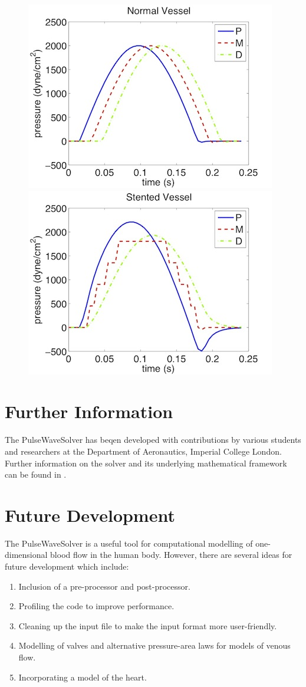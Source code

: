 \begin{figure}
	\includegraphics[width=0.49\linewidth]{img/pressure_normal_vessel.jpg}
	\includegraphics[width=0.49\linewidth]{img/pressure_stented_vessel.jpg}
\end{figure}

\section{Further Information}
The PulseWaveSolver has beqen developed with contributions by various students
and researchers at the Department of Aeronautics, Imperial College London. 
Further information on the solver and its underlying mathematical framework 
can be found in \cite{Ro12,Pi12}.

\section{Future Development}
The PulseWaveSolver is a useful tool for computational modelling of
one-dimensional blood flow in the human body. However, there are several ideas
for future development which include:
\begin{enumerate}
\item Inclusion of a pre-processor and post-processor.
\item Profiling the code to improve performance.
\item Cleaning up the input file to make the input format more user-friendly.
\item Modelling of valves and alternative pressure-area laws for models of
venous flow.
\item Incorporating a model of the heart.
\end{enumerate}

